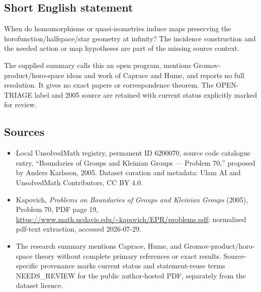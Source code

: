 \documentclass[11pt]{article}
\begin{document}
\subsection{Short English statement}
When do homomorphisms or quasi-isometries induce maps preserving the horofunction/halfspace/star geometry at infinity? The incidence construction and the needed action or map hypotheses are part of the missing source context.

The supplied summary calls this an open program, mentions Gromov-product/horo-space ideas and work of Caprace and Hume, and reports no full resolution. It gives no exact papers or correspondence theorem. The OPEN-TRIAGE label and 2005 source are retained with current status explicitly marked for review.
\subsection{Sources}
\begin{itemize}
\item Local UnsolvedMath registry, permanent ID 6200070, source code catalogue entry, ``Boundaries of Groups and Kleinian Groups --- Problem 70,'' proposed by Anders Karlsson, 2005. Dataset curation and metadata: Ulam AI and UnsolvedMath Contributors, CC BY 4.0.
\item Kapovich, \emph{Problems on Boundaries of Groups and Kleinian Groups} (2005), Problem 70, PDF page 19, \url{https://www.math.ucdavis.edu/~kapovich/EPR/problems.pdf}; normalized pdf-text extraction, accessed 2026-07-29.
\item The research summary mentions Caprace, Hume, and Gromov-product/horo-space theory without complete primary references or exact results. Source-specific provenance marks current status and statement-reuse terms NEEDS\_REVIEW for the public author-hosted PDF, separately from the dataset licence.
\end{itemize}
\end{document}
